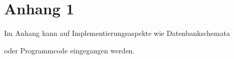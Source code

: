 \documentclass[pdftex,12pt,a4paper]{report}
\begin{document}
\appendix


\chapter{Anhang 1}

Im Anhang kann auf Implementierungsaspekte wie Datenbankschemata

oder Programmcode eingegangen werden.



\listoffigures



\listoftables



    



\end{document}
